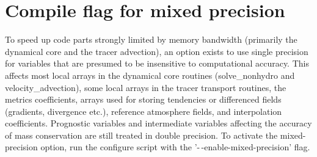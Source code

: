 \section{Compile flag for mixed precision}

To speed up code parts strongly limited by memory bandwidth (primarily the dynamical core and the tracer advection), 
an option exists to use single precision for variables that are presumed to be insensitive to computational accuracy.
This affects most local arrays in the dynamical core routines (solve\_nonhydro and velocity\_advection), some local
arrays in the tracer transport routines, the metrics coefficients,
arrays used for storing tendencies or differenced fields (gradients, divergence etc.), reference atmosphere fields,
and interpolation coefficients. Prognostic variables and intermediate variables affecting the accuracy of mass conservation
are still treated in double precision. To activate the mixed-precision option, run the configure script with the 
'-\,-enable-mixed-precision' flag.




